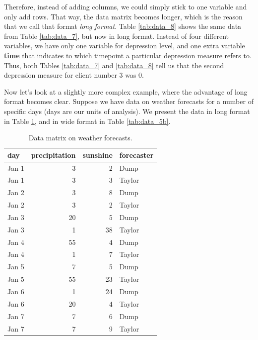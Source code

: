 \documentclass[]{book}\usepackage[]{graphicx}\usepackage[]{color}
\begin{document}
Therefore, instead of adding columns, we could simply stick to one variable and only add rows. That way, the data matrix becomes longer, which is the reason that we call that format \textit{long format}. Table \ref{tab:data_8} shows the same data from Table \ref{tab:data_7}, but now in long format. Instead of four different variables, we have only one variable for depression level, and one extra variable \textbf{time} that indicates to which timepoint a particular depression measure refers to. Thus, both Tables \ref{tab:data_7} and \ref{tab:data_8} tell us that the second depression measure for client number 3 was 0.

Now let's look at a slightly more complex example, where the advantage of long format becomes clear. Suppose we have data on weather forecasts for a number of specific days (days are our units of analysis). We present the data in long format in Table \ref{tab:data_5}, and in wide format in Table \ref{tab:data_5b}.


\begin{table}[ht]
\centering
\caption{Data matrix on weather forecasts.} 
\label{tab:data_5}
\begin{tabular}{lrrl}
  \hline
day & precipitation & sunshine & forecaster \\ 
  \hline
Jan 1 & 3 & 2 & Dump \\ 
  Jan 1 & 3 & 3 & Taylor \\ 
  Jan 2 & 3 & 8 & Dump \\ 
  Jan 2 & 3 & 2 & Taylor \\ 
  Jan 3 & 20 & 5 & Dump \\ 
  Jan 3 & 1 & 38 & Taylor \\ 
  Jan 4 & 55 & 4 & Dump \\ 
  Jan 4 & 1 & 7 & Taylor \\ 
  Jan 5 & 7 & 5 & Dump \\ 
  Jan 5 & 55 & 23 & Taylor \\ 
  Jan 6 & 1 & 24 & Dump \\ 
  Jan 6 & 20 & 4 & Taylor \\ 
  Jan 7 & 7 & 6 & Dump \\ 
  Jan 7 & 7 & 9 & Taylor \\ 
   \hline
\end{tabular}
\end{table}
\end{document}
